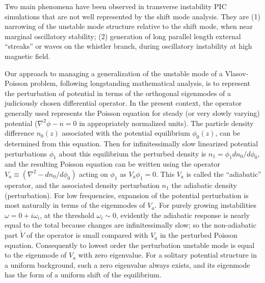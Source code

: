 \documentclass[12pt]{article}
\begin{document}
Two main phenomena have been observed in transverse instability PIC
simulations that are not well represented by the shift mode
analysis. They are (1) narrowing of the unstable mode structure
relative to the shift mode, when near marginal oscillatory
stability\cite{Hutchinson2019}; (2) generation of long parallel length
external ``streaks'' or waves on the whistler branch, during
oscillatory instability at high magnetic field\cite{Hutchinson2019a}.

Our approach to managing a generalization of the unstable mode of a
Vlasov-Poisson problem, following longstanding mathematical
analysis\cite{Lewis1979}, is to represent the perturbation of
potential in terms of the orthogonal eigenmodes of a
judiciously chosen differential operator. In the present context, the
operator generally used\cite{Lewis1982} represents the Poisson
equation for steady (or very slowly varying) potential
($\nabla^2\phi-n=0$ in appropriately normalized units). The particle
density difference $n_0(z)$ associated with the potential equilibrium
$\phi_0(z)$, can be determined from this equation. Then for
infinitessimally slow linearized potential perturbations $\phi_1$
about this equilibrium the perturbed density is
$n_1=\phi_1dn_0/d\phi_0$, and the resulting Poisson equation can be
written using the operator $V_a \equiv(\nabla^2-dn_0/d\phi_0)$ acting
on $\phi_1$ as $V_a\phi_1=0$. This $V_a$ is called the ``adiabatic''
operator, and the associated density perturbation $n_1$ the adiabatic
density (perturbation). For low frequencies, expansion of the
potential perturbation is most naturally in terms of the eigenmodes of
$V_a$. For purely growing instabilities $\omega=0+i\omega_i$, at the
threshold $\omega_i\sim 0$, evidently the adiabatic response is nearly
equal to the total because changes are infinitessimally slow; so the
non-adiabatic part $\tilde V$ of the operator is small compared with
$V_a$ in the perturbed Poisson equation. Consequently to lowest order
the perturbation unstable mode is equal to the eigenmode of $V_a$ with
zero eigenvalue. For a solitary potential structure in a uniform
background, such a zero eigenvalue always exists, and its eigenmode
has the form of a uniform shift of the equilibrium.
\end{document}
